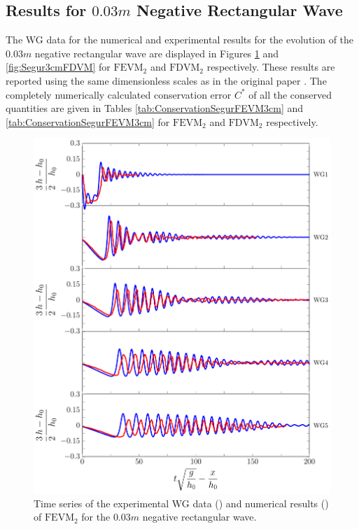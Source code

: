 \subsection{Results for $0.03m$ Negative Rectangular Wave}
The WG data for the numerical and experimental results for the evolution of the $0.03m$ negative rectangular wave are displayed in Figures \ref{fig:Segur3cmFEVM} and \ref{fig:Segur3cmFDVM} for $\text{FEVM}_2$ and $\text{FDVM}_2$ respectively. These results are reported using the same dimensionless scales as in the original paper \cite{Hammack-Segur-1978-337}. The completely numerically calculated conservation error $C^*$ of all the conserved quantities are given in Tables \ref{tab:ConservationSegurFEVM3cm} and \ref{tab:ConservationSegurFEVM3cm} for $\text{FEVM}_2$ and $\text{FDVM}_2$ respectively.
\begin{figure}
	\centering
	\includegraphics[width=\textwidth]{./chp6/figures/Experiment/Segur/LongWGsFEVM3cm.pdf}
	\caption{Time series of the experimental WG data ({\color{red}\solidrule}) and numerical results ({\color{blue}\solidrule}) of $\text{FEVM}_2$ for the $0.03m$ negative rectangular wave.}
	\label{fig:Segur3cmFEVM}
\end{figure}

